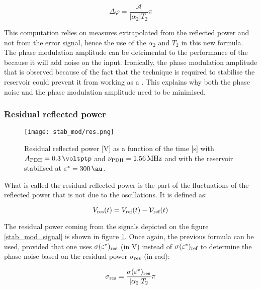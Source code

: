 \begin{equation}
	\Delta \varphi = \frac{\mathcal{A}}{|\alpha_2| T_2} \pi
\end{equation} 

This computation relies on measures extrapolated from the reflected power and not from the error signal, hence the use of the $\alpha_2$ and $T_2$ in this new formula.\\

The phase modulation amplitude can be detrimental to the performance of the \rcer because it will add noise on the input. Ironically, the phase modulation amplitude that is observed because of the fact that the \pdh technique is required to stabilise the reservoir could prevent it from working as a \rcer. This explains why both the phase noise and the phase modulation amplitude need to be minimised.


\subsubsection{Residual reflected power}

\begin{figure}
	\centering
	\texttt{[image: stab\_mod/res.png]}
	\caption{Residual reflected power [\si{\volt}] as a function of the time [\si{\second}] with $\tind{A}{PDH} = \SI{0.3}{\voltptp}$ and $\nu_{\text{PDH}} = \SI{1.56}{\mega\hertz}$ and with the reservoir stabilised at $\epsilon^* = \SI{300}{\au}$.}
	\label{stab_res}
\end{figure}

What is called the residual reflected power is the part of the fluctuations of the reflected power that is not due to the oscillations. It is defined as:

\begin{equation}
	V_{\text{res}}(t) = V_{\text{ref}}(t) - \mathcal{V}_{\text{ref}}(t)
\end{equation}

The residual power coming from the signals depicted on the figure \ref{stab_mod_signal} is shown in figure \ref{stab_res}. Once again, the previous formula can be used, provided that one uses $\sigma(\varepsilon^*)_{\text{res}}$ (in \si{\volt}) instead of $\sigma(\varepsilon^*)_{\text{ref}}$ to determine the phase noise based on the residual power $\sigma_{\text{res}}$ (in \si{\radian}):

\begin{equation}
	\sigma_{\text{res}} = \frac{\sigma(\varepsilon^*)_{\text{res}}}{|\alpha_2|T_2}\pi
\end{equation}

